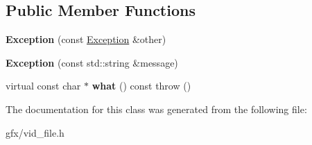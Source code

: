 \subsection*{Public Member Functions}
\begin{DoxyCompactItemize}
\item 
{\bfseries Exception} (const \hyperlink{classVidFile_1_1Exception}{Exception} \&other)\hypertarget{classVidFile_1_1Exception_a20aad509b98090f76c8eb589cba7a4b6}{}\label{classVidFile_1_1Exception_a20aad509b98090f76c8eb589cba7a4b6}

\item 
{\bfseries Exception} (const std\+::string \&message)\hypertarget{classVidFile_1_1Exception_adfb10e829b13407b9c8c12f0b665919c}{}\label{classVidFile_1_1Exception_adfb10e829b13407b9c8c12f0b665919c}

\item 
virtual const char $\ast$ {\bfseries what} () const   throw ()\hypertarget{classVidFile_1_1Exception_ae6d45bc59c76a486646d15059f8bf92b}{}\label{classVidFile_1_1Exception_ae6d45bc59c76a486646d15059f8bf92b}

\end{DoxyCompactItemize}


The documentation for this class was generated from the following file\+:\begin{DoxyCompactItemize}
\item 
gfx/vid\+\_\+file.\+h\end{DoxyCompactItemize}
